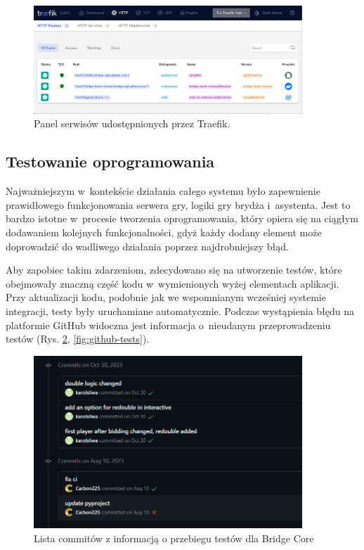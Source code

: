 \begin{figure}[hbt!]
    \centering
    \includegraphics[width=0.9\textwidth]{img/traefik/dashboard.png}
    \caption{Panel serwisów udostępnionych przez Traefik.}
    \label{fig:traefik-dashboard}
\end{figure}


\subsection{Testowanie oprogramowania}

Najważniejszym w~kontekście działania całego systemu
było zapewnienie prawidłowego funkcjonowania
serwera gry, logiki gry brydża i~asystenta.
Jest to bardzo istotne w~procesie tworzenia oprogramowania,
który opiera się na ciągłym dodawaniem kolejnych
funkcjonalności, gdyż każdy dodany element może doprowadzić
do wadliwego działania poprzez najdrobniejszy błąd.

Aby zapobiec takim zdarzeniom, zdecydowano się na utworzenie
testów, które obejmowały znaczną część kodu w~wymienionych
wyżej elementach aplikacji. Przy aktualizacji kodu,
podobnie jak we wspomnianym wcześniej systemie integracji,
testy były uruchamiane automatycznie. Podczas wystąpienia
błędu na platformie GitHub widoczna jest informacja
o~nieudanym przeprowadzeniu testów
(Rys. \ref{fig:github-commits}, \ref{fig:github-tests}).

\begin{figure}[hbt!]
    \centering
    \includegraphics[width=0.9\textwidth]{img/github/github-commits.png}
    \caption{Lista commitów z informacją o przebiegu testów dla Bridge Core}
    \label{fig:github-commits}
\end{figure}

